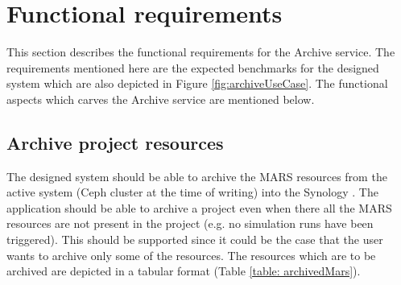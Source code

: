 \newpage
\section{Functional requirements}
    \label{section:functionalReq}
    This section describes the functional requirements for the Archive service.
    The requirements mentioned here are the expected benchmarks for the designed system which are also depicted in Figure \ref{fig:archiveUseCase}.
    The functional aspects which carves the Archive service are mentioned below.

    \subsection{Archive project resources}
        The designed system should be able to archive the MARS resources from the active system (Ceph cluster at the time of writing) 
        into the Synology \cite{Synology}. The application should
        be able to archive a project even when there all the MARS resources are not present in the project (e.g. no simulation runs have been triggered).
        This should be supported since it could be the case that the user wants to archive only some of the resources. The resources which are to be archived
        are depicted in a tabular format (Table \ref{table: archivedMars}).
        
